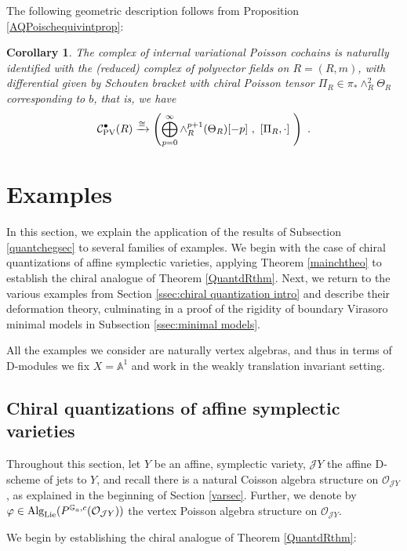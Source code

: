 \documentclass[11pt]{amsart}
\numberwithin{equation}{section}
\newtheorem{coro}[theo]{Corollary}
\theoremstyle{definition}
\newcommand{\mc}{\mathcal}
\newcommand{\Alg}{{\textup{Alg}}}
\newcommand{\Lie}{{\textup{Lie}}}
\newcommand{\PV}{{{\textup{PV}}}}
\newcommand{\0}{{\textbf{0}}}
\def\IA{\mathbb{A}}
\def\IG{\mathbb{G}}
\begin{document}
The following geometric description follows from Proposition \ref{AQPoischequivintprop}:
\begin{coro}\label{gPCchcoro} The complex of internal variational Poisson cochains is naturally identified with the (reduced) complex of polyvector fields on $R=(R,m)$, with differential given by Schouten bracket with chiral Poisson tensor $\Pi_R \in \pi_*\wedge^2_R\Theta_R$ corresponding to $b$, that is, we have
	\[ \mc C^\bullet_\PV(R) \xrightarrow{\cong} \left( \bigoplus_{p=0}^\infty \wedge^{p+1}_R(\Theta_R)[-p] \ , \ [\Pi_R,\cdot] \ \right) \ .  \]
\end{coro}

\fi




\section{Examples}\label{sec:examples}

In this section, we explain the application of the results of Subsection \ref{quantchegsec} to several families of examples. We begin with the case of chiral quantizations of affine symplectic varieties, applying Theorem \ref{mainchtheo} to establish the chiral analogue of Theorem \ref{QuantdRthm}. Next, we return to the various examples from Section \ref{ssec:chiral quantization intro} and describe their deformation theory, culminating in a proof of the rigidity of boundary Virasoro minimal models in Subsection \ref{ssec:minimal models}.

All the examples we consider are naturally vertex algebras, and thus in terms of D-modules we fix $X=\IA^1$ and work in the weakly translation invariant setting. 


\subsection{Chiral quantizations of affine symplectic varieties}\label{sympsec} Throughout this section, let $Y$ be an affine, symplectic variety, $\mc J Y$ the affine D-scheme of jets to $Y$, and recall there is a natural Coisson algebra structure on $\mc O_{\mc J Y}$, as explained in the beginning of Section \ref{varsec}. Further, we denote by $\varphi\in \Alg_{\Lie}(P^{\IG_a,c}(\mc O_{\mc J Y}))$ the vertex Poisson algebra structure on $\mc O_{\mc J Y}$.

We begin by establishing the chiral analogue of Theorem \ref{QuantdRthm}:
\end{document}
